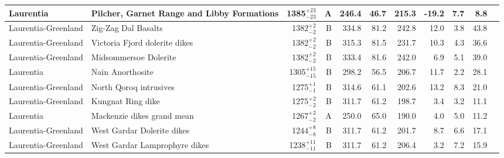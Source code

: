 \begin{ThreePartTable}
\begin{longtable}{p{1.4 in}p{1.2 in}rrrrrrrrp{1.2 in}}
                     Laurentia &         Pilcher, Garnet Range and Libby Formations &   1385$^{+23}_{-23}$ &      A &     246.4 &      46.7 & 215.3 & -19.2 &       7.7 &         8.8 &                                 \cite{Elston2002a} \\ \hline
           Laurentia-Greenland &                                Zig-Zag Dal Basalts &     1382$^{+2}_{-2}$ &      B &     334.8 &      81.2 & 242.8 &  12.0 &       3.8 &        43.8 &                              \cite{Marcussen1983a} \\ \hline
           Laurentia-Greenland &                      Victoria Fjord dolerite dikes &     1382$^{+2}_{-2}$ &      B &     315.3 &      81.5 & 231.7 &  10.3 &       4.3 &        36.6 &                             \cite{Abrahamsen1987a} \\ \hline
           Laurentia-Greenland &                              Midsommersoe Dolerite &     1382$^{+2}_{-2}$ &      B &     333.4 &      81.6 & 242.0 &   6.9 &       5.1 &        39.0 &                              \cite{Marcussen1983a} \\ \hline
                     Laurentia &                                   Nain Anorthosite &   1305$^{+15}_{-15}$ &      B &     298.2 &      56.5 & 206.7 &  11.7 &       2.2 &        28.1 &                                 \cite{Murthy1978a} \\ \hline
           Laurentia-Greenland &                             North Qoroq intrusives &     1275$^{+1}_{-1}$ &      B &     314.6 &      61.1 & 202.6 &  13.2 &       8.3 &        21.0 &                                  \cite{Piper1992a} \\ \hline
           Laurentia-Greenland &                                  Kungnat Ring dike &     1275$^{+2}_{-2}$ &      B &     311.7 &      61.2 & 198.7 &   3.4 &       3.2 &        11.1 &                                  \cite{Piper1977b} \\ \hline
                     Laurentia &                         Mackenzie dikes grand mean &     1267$^{+2}_{-2}$ &      A &     250.0 &      65.0 & 190.0 &   4.0 &       5.0 &        11.2 &                                 \cite{Buchan2000a} \\ \hline
           Laurentia-Greenland &                         West Gardar Dolerite dikes &     1244$^{+8}_{-8}$ &      B &     311.7 &      61.2 & 201.7 &   8.7 &       6.6 &        17.1 &                                  \cite{Piper1977b} \\ \hline
           Laurentia-Greenland &                      West Gardar Lamprophyre dikes &   1238$^{+11}_{-11}$ &      B &     311.7 &      61.2 & 206.4 &   3.2 &       7.2 &        15.9 &                                  \cite{Piper1977b} \\ \hline

\end{longtable}
\end{ThreePartTable}
